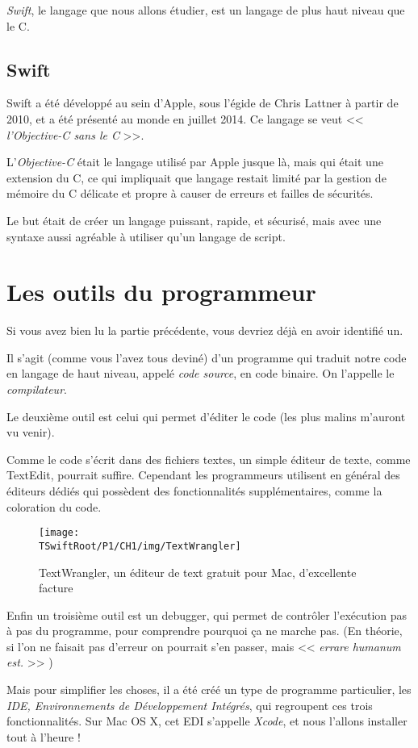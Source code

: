 \emph{Swift}, le langage que nous allons étudier, est un langage de plus haut niveau
que le C.
\subsection{Swift}
Swift a été développé au sein d'Apple, sous l'égide de Chris Lattner à partir de 2010, et a
été présenté au monde en juillet 2014. Ce langage se veut << \emph{l'Objective-C sans le C} >>.

L'\emph{Objective-C} était le langage utilisé par Apple jusque là, mais qui était une extension du
C, ce qui impliquait que langage restait limité par la gestion de mémoire du C délicate et propre à causer de erreurs et failles de sécurités.

Le but était de créer un langage puissant, rapide, et sécurisé, mais avec une syntaxe
aussi agréable à utiliser qu’un langage de script.
\section{Les outils du programmeur}
Si vous avez bien lu la partie précédente, vous devriez déjà en avoir identifié un.

Il s'agit (comme vous l'avez tous deviné) d'un programme qui traduit notre code en
langage de haut niveau, appelé \emph{code source}, en code binaire. On l'appelle le
\emph{compilateur}.

%

Le deuxième outil est celui qui permet d'éditer le code (les plus malins m'auront vu venir).

Comme le code s'écrit dans des fichiers textes, un simple éditeur de texte, comme
TextEdit, pourrait suffire. Cependant les programmeurs utilisent en général des éditeurs
dédiés qui possèdent des fonctionnalités supplémentaires, comme la coloration du code.
\begin{figure}[h]
\centering
\texttt{[image: \\TSwiftRoot/P1/CH1/img/TextWrangler]}
\caption{TextWrangler, un éditeur de text gratuit pour Mac, d'excellente facture}
\end{figure}

Enfin un troisième outil est un debugger, qui permet de contrôler l'exécution pas à pas du
programme, pour comprendre pourquoi ça ne marche pas. (En théorie, si l'on ne faisait
pas d'erreur on pourrait s'en passer, mais << \emph{errare humanum est.} >> )

Mais pour simplifier les choses, il a été créé un type de programme particulier, les \emph{IDE,
Environnements de Développement Intégrés}, qui regroupent ces trois fonctionnalités. Sur
Mac OS X, cet EDI s'appelle \emph{Xcode}, et nous l'allons installer tout à l'heure !